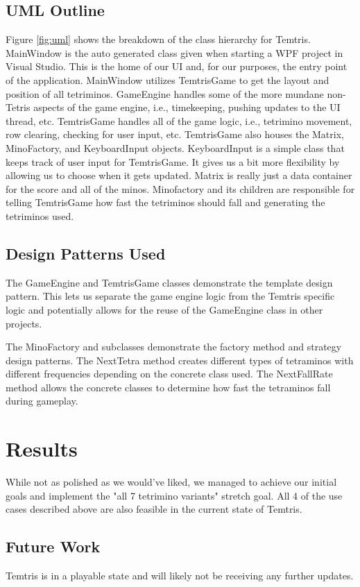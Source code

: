 \documentclass[10pt,conference,onecolumn,compsoc]{IEEEtran}
\begin{document}
\subsection{UML Outline}
Figure \ref{fig:uml} shows the breakdown of the class hierarchy for Temtris. MainWindow is the auto generated class given when starting a WPF project in Visual Studio. This is the home of our UI and, for our purposes, the entry point of the application. MainWindow utilizes TemtrisGame to get the layout and position of all tetriminos. GameEngine handles some of the more mundane non-Tetris aspects of the game engine, i.e., timekeeping, pushing updates to the UI thread, etc. TemtrisGame handles all of the game logic, i.e., tetrimino movement, row clearing, checking for user input, etc. TemtrisGame also houses the Matrix, MinoFactory, and KeyboardInput objects. KeyboardInput is a simple class that keeps track of user input for TemtrisGame. It gives us a bit more flexibility by allowing us to choose when it gets updated. Matrix is really just a data container for the score and all of the minos. Minofactory and its children are responsible for telling TemtrisGame how fast the tetriminos should fall and generating the tetriminos used.

\subsection{Design Patterns Used}
The GameEngine and TemtrisGame classes demonstrate the template design pattern. This lets us separate the game engine logic from the Temtris specific logic and potentially allows for the reuse of the GameEngine class in other projects.

The MinoFactory and subclasses demonstrate the factory method and strategy design patterns. The NextTetra method creates different types of tetraminos with different frequencies depending on the concrete class used. The NextFallRate method allows the concrete classes to determine how fast the tetraminos fall during gameplay.


\section{Results}
While not as polished as we would've liked, we managed to achieve our initial goals and implement the "all 7 tetrimino variants" stretch goal. All 4 of the use cases described above are also feasible in the current state of Temtris. 

\subsection{Future Work}
Temtris is in a playable state and will likely not be receiving any further updates.
\end{document}
